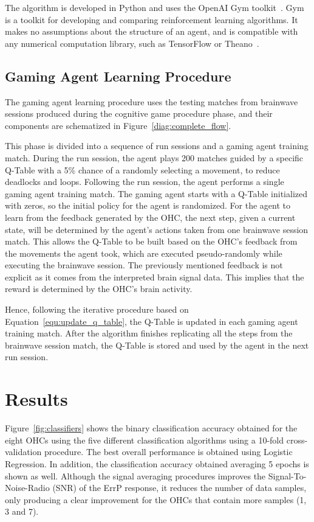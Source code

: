 \documentclass[journal]{IEEEtran}
\begin{document}
{{The algorithm is developed in Python and uses the OpenAI Gym toolkit~\cite{openai}. Gym is a toolkit for developing and comparing reinforcement learning algorithms. It makes no assumptions about the structure of an agent, and is compatible with any numerical computation library, such as TensorFlow or Theano~\cite{tensorflow2015-whitepaper}.

\subsection{Gaming Agent Learning Procedure}
\label{q_learning_step_alg}

The gaming agent learning procedure uses the testing matches from brainwave sessions produced during the cognitive game procedure phase, and their components are schematized in Figure~\ref{diag:complete_flow}.

This phase is divided into a sequence of run sessions and a gaming agent training match.  During the run session, the agent plays 200 matches guided by a specific Q-Table with a 5\% chance of a randomly selecting a movement, to reduce deadlocks and loops.  Following the run session, the agent performs a single gaming agent training match.  The gaming agent starts with a Q-Table initialized with zeros, so the initial policy for the agent is randomized.  For the agent to learn from the feedback generated by the OHC, the next step, given a current state, will be determined by the agent's actions taken from one brainwave session match. This allows the Q-Table to be built based on the OHC's feedback from the movements the agent took, which are executed pseudo-randomly while executing the brainwave session.  The previously mentioned feedback is not explicit as it comes from the interpreted brain signal data. This implies that the reward is determined by the OHC's brain activity.

Hence, following the iterative procedure based on Equation~\ref{equ:update_q_table}, the Q-Table is updated in each gaming agent training match. After the algorithm finishes replicating all the steps from the brainwave session match, the Q-Table is stored and used by the agent in the next run session.


\section{Results}
\label{results}

Figure~\ref{fig:classifiers} shows the binary classification accuracy obtained for the eight OHCs using the five different classification algorithms using a 10-fold cross-validation procedure.  The best overall performance is obtained using Logistic Regression.  In addition, the classification accuracy obtained averaging 5 epochs is shown as well.  Although the signal averaging procedures improves the Signal-To-Noise-Radio (SNR) of the ErrP response, it reduces the number of data samples, only producing a clear improvement for the OHCs that contain more samples (1, 3 and 7).

}}
\end{document}
